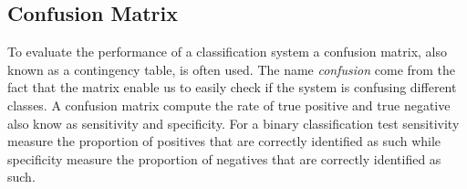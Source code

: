    \subsection{Confusion Matrix}

    To evaluate the performance of a classification system a confusion matrix, also known as a contingency table, is often used. The name \textit{confusion} come from the fact that the matrix enable us to easily check if the system is confusing different classes. A confusion matrix compute the rate of true positive and true negative also know as sensitivity and specificity. For a binary classification test sensitivity measure the proportion of positives that are correctly identified as such while specificity measure the proportion of negatives that are correctly identified as such.
